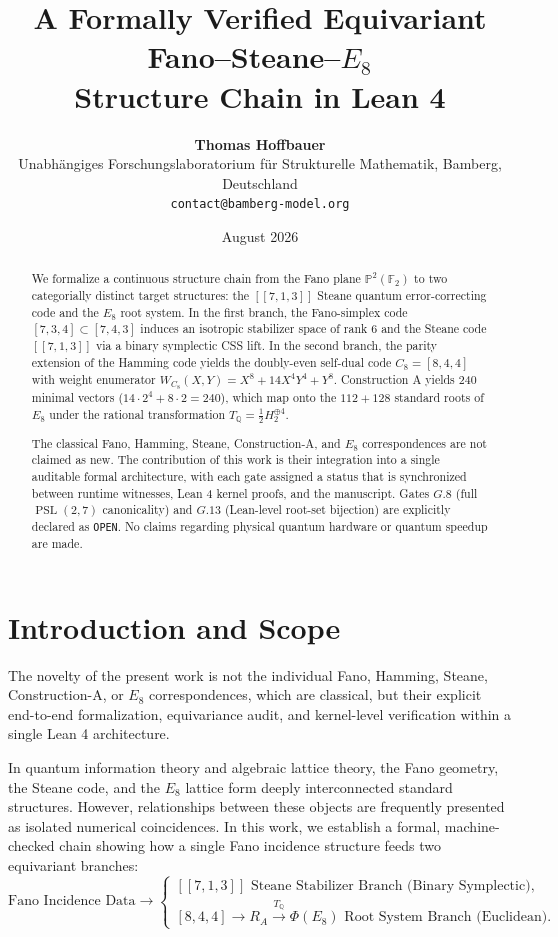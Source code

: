 \documentclass[11pt,a4paper]{article}
\title{\textbf{A Formally Verified Equivariant Fano--Steane--$E_8$\\ Structure Chain in Lean 4}}
\author{\textbf{Thomas Hoffbauer}\\
	\small Unabhängiges Forschungslaboratorium für Strukturelle Mathematik, Bamberg, Deutschland\\
	\small \texttt{contact@bamberg-model.org}}
\date{August 2026}
\theoremstyle{definition}
\begin{document}
	
	\maketitle
	
	\begin{abstract}
		We formalize a continuous structure chain from the Fano plane $\mathbb{P}^2(\mathbb{F}_2)$ to two categorially distinct target structures: the $[[7,1,3]]$ Steane quantum error-correcting code and the $E_8$ root system. In the first branch, the Fano-simplex code $[7,3,4] \subset [7,4,3]$ induces an isotropic stabilizer space of rank 6 and the Steane code $[[7,1,3]]$ via a binary symplectic CSS lift. In the second branch, the parity extension of the Hamming code yields the doubly-even self-dual code $C_8 = [8,4,4]$ with weight enumerator $W_{C_8}(X,Y) = X^8 + 14X^4Y^4 + Y^8$. Construction A yields 240 minimal vectors ($14 \cdot 2^4 + 8 \cdot 2 = 240$), which map onto the $112+128$ standard roots of $E_8$ under the rational transformation $T_{\mathbb{Q}} = \frac{1}{2} H_2^{\oplus 4}$.
		
		The classical Fano, Hamming, Steane, Construction-A, and $E_8$ correspondences are not claimed as new. The contribution of this work is their integration into a single auditable formal architecture, with each gate assigned a status that is synchronized between runtime witnesses, Lean 4 kernel proofs, and the manuscript. Gates $G.8$ (full $\operatorname{PSL}(2,7)$ canonicality) and $G.13$ (Lean-level root-set bijection) are explicitly declared as \texttt{OPEN}. No claims regarding physical quantum hardware or quantum speedup are made.
	\end{abstract}
	
	\section{Introduction and Scope}
	
	The novelty of the present work is not the individual Fano, Hamming, Steane, Construction-A, or $E_8$ correspondences, which are classical, but their explicit end-to-end formalization, equivariance audit, and kernel-level verification within a single Lean 4 architecture.
	
	In quantum information theory and algebraic lattice theory, the Fano geometry, the Steane code, and the $E_8$ lattice form deeply interconnected standard structures. However, relationships between these objects are frequently presented as isolated numerical coincidences. In this work, we establish a formal, machine-checked chain showing how a single Fano incidence structure feeds two equivariant branches:
	\[
	\text{Fano Incidence Data} \longrightarrow \begin{cases}
		[[7,1,3]] \text{ Steane Stabilizer Branch (Binary Symplectic)}, \\
		{}[8,4,4] \to R_A \xrightarrow{T_{\mathbb{Q}}} \Phi(E_8) \text{ Root System Branch (Euclidean)}.
	\end{cases}
	\]
	
\end{document}
